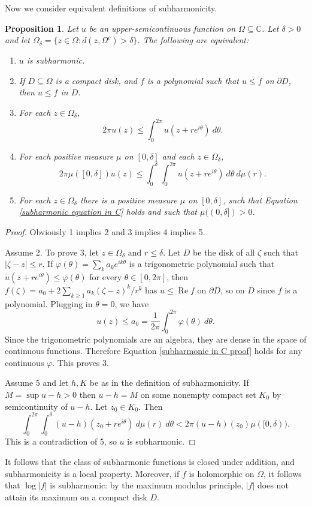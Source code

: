 \documentclass[12pt]{report}
\newcommand{\CC}{\mathbb{C}}
\renewcommand{\Re}{\operatorname{Re}}
\newtheorem{proposition}[theorem]{Proposition}
\theoremstyle{definition}
\begin{document}
Now we consider equivalent definitions of subharmonicity.
\begin{proposition}
Let $u$ be an upper-semicontinuous function on $\Omega \subseteq \CC$. Let $\delta > 0$ and let $\Omega_\delta = \{z \in \Omega: d(z, \Omega^c) > \delta\}$. The following are equivalent:
\begin{enumerate}
    \item $u$ is subharmonic.
    \item If $D \subseteq \Omega$ is a compact disk, and $f$ is a polynomial such that $u \leq f$ on $\partial D$, then $u \leq f$ in $D$.
    \item For each $z \in \Omega_\delta$,
    $$2\pi u(z) \leq \int_0^{2\pi} u(z+re^{i\theta}) ~d\theta.$$
    \item For each positive measure $\mu$ on $[0, \delta]$ and each $z \in \Omega_\delta$,
    \begin{equation}
        \label{subharmonic equation in C}
        2\pi \mu([0, \delta]) u(z) \leq \int_0^\delta \int_0^{2\pi} u(z + re^{i\theta}) ~d\theta ~d\mu(r).
    \end{equation}
    \item For each $z \in \Omega_\delta$ there is a positive measure $\mu$ on $[0, \delta]$, such that Equation \ref{subharmonic equation in C} holds and such that $\mu((0, \delta]) > 0$.
\end{enumerate}
\end{proposition}
\begin{proof}
    Obviously 1 implies 2 and 3 implies 4 implies 5.
    
    Assume 2. To prove 3, let $z \in \Omega_\delta$ and $r \leq \delta$. Let $D$ be the disk of all $\zeta$ such that $|\zeta - z| \leq r$. If $\varphi(\theta) = \sum_k a_k e^{ik\theta}$ is a trigonometric polynomial such that $u(z + re^{i\theta}) \leq \varphi(\theta)$ for every $\theta \in [0, 2\pi]$, then $f(\zeta) = a_0 + 2\sum_{k\geq 1} a_k(\zeta - z)^k/r^k$ has $u \leq \Re f$ on $\partial D$, so on $D$ since $f$ is a polynomial. Plugging in $\theta = 0$, we have
\begin{equation}
    \label{subharmonic in C proof}
    u(z) \leq a_0 = \frac{1}{2\pi} \int_0^{2\pi} \varphi(\theta) ~d\theta.
\end{equation}
    Since the trigonometric polynomials are an algebra, they are dense in the space of continuous functions. Therefore Equation \ref{subharmonic in C proof} holds for any continuous $\varphi$. This proves 3.
    
    Assume 5 and let $h, K$ be as in the definition of subharmonicity. If $M = \sup u - h > 0$ then $u - h = M$ on some nonempty compact set $K_0$ by semicontinuity of $u - h$. Let $z_0 \in K_0$. Then
    $$\int_0^{2\pi} \int_0^\delta (u-h)(z_0 + re^{i\theta}) ~d\mu(r) ~d\theta < 2\pi (u-h)(z_0) \mu([0, \delta)).$$
    This is a contradiction of 5, so $u$ is subharmonic.
\end{proof}
    It follows that the class of subharmonic functions is closed under addition, and subharmonicity is a local property. Moreover, if $f$ is holomorphic on $\Omega$, it follows that $\log|f|$ is subharmonic: by the maximum modulus principle, $|f|$ does not attain its maximum on a compact disk $D$.
\end{document}
